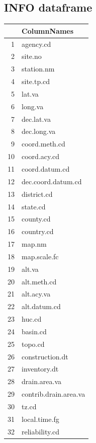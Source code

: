 \documentclass[a4paper,11pt]{article}\usepackage[]{graphicx}\usepackage[]{color}
\begin{document}
\subsection{INFO dataframe}
\label{sec:appendix2INFO}

\begin{table}[ht]
\centering
\begin{tabular}{rl}
  \hline
 & ColumnNames \\ 
  \hline
1 & agency.cd \\ 
  2 & site.no \\ 
  3 & station.nm \\ 
  4 & site.tp.cd \\ 
  5 & lat.va \\ 
  6 & long.va \\ 
  7 & dec.lat.va \\ 
  8 & dec.long.va \\ 
  9 & coord.meth.cd \\ 
  10 & coord.acy.cd \\ 
  11 & coord.datum.cd \\ 
  12 & dec.coord.datum.cd \\ 
  13 & district.cd \\ 
  14 & state.cd \\ 
  15 & county.cd \\ 
  16 & country.cd \\ 
  17 & map.nm \\ 
  18 & map.scale.fc \\ 
  19 & alt.va \\ 
  20 & alt.meth.cd \\ 
  21 & alt.acy.va \\ 
  22 & alt.datum.cd \\ 
  23 & huc.cd \\ 
  24 & basin.cd \\ 
  25 & topo.cd \\ 
  26 & construction.dt \\ 
  27 & inventory.dt \\ 
  28 & drain.area.va \\ 
  29 & contrib.drain.area.va \\ 
  30 & tz.cd \\ 
  31 & local.time.fg \\ 
  32 & reliability.cd \\ 

\end{tabular}
\end{table}
\end{document}

